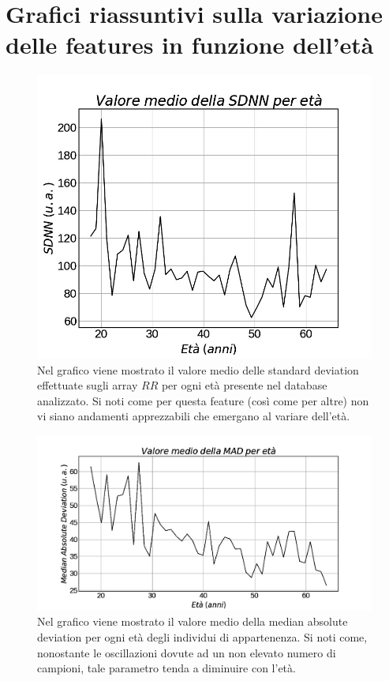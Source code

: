 \documentclass[a4paper, 12pt]{book}
\begin{document}
\section{Grafici riassuntivi sulla variazione delle features in funzione dell'età}

\begin{figure}[h!]
	\centering
	\includegraphics[width=\textwidth]{SDNN-age.jpg}
	\caption{Nel grafico viene mostrato il valore medio delle standard deviation 				effettuate sugli array $RR$ per ogni età presente nel database analizzato.
	Si noti come per questa feature (così come per altre) non vi siano andamenti 				apprezzabili che emergano al variare dell'età.}
	\label{fig:SDNN-age}
\end{figure}

\begin{figure}[h!]
	\centering
	\includegraphics[width=\textwidth]{MAD-age.jpg}
	\caption{Nel grafico viene mostrato il valore medio della median absolute deviation 	per ogni età degli individui di appartenenza.
	Si noti come, nonostante le oscillazioni dovute ad un non elevato numero di 				campioni, tale parametro tenda a diminuire con l'età.}
	\label{fig:MAD-age}
\end{figure}
\end{document}

